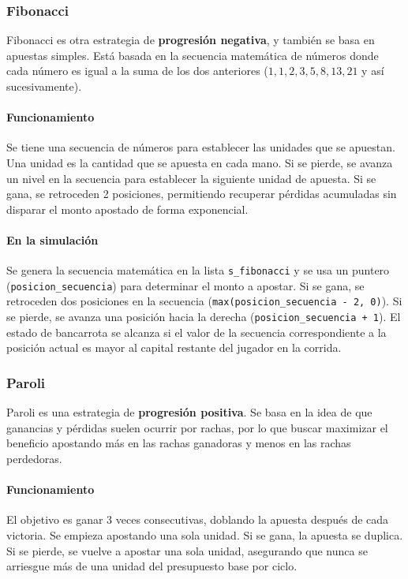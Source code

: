 \documentclass{article}
\begin{document}
\subsubsection{Fibonacci}
Fibonacci es otra estrategia de \textbf{progresión negativa}, y también se basa en apuestas simples. Está basada en la secuencia matemática de números donde cada número es igual a la suma de los dos anteriores ($1, 1, 2, 3, 5, 8, 13, 21$ y así sucesivamente).

\paragraph{Funcionamiento} Se tiene una secuencia de números para establecer las unidades que se apuestan. Una unidad es la cantidad que se apuesta en cada mano. Si se pierde, se avanza un nivel en la secuencia para establecer la siguiente unidad de apuesta. Si se gana, se retroceden 2 posiciones, permitiendo recuperar pérdidas acumuladas sin disparar el monto apostado de forma exponencial.\cite{fibonacci}

\paragraph{En la simulación} Se genera la secuencia matemática en la lista \texttt{s\_fibonacci} y se usa un puntero (\texttt{posicion\_secuencia}) para determinar el monto a apostar. Si se gana, se retroceden dos posiciones en la secuencia (\texttt{max(posicion\_secuencia - 2, 0)}). Si se pierde, se avanza una posición hacia la derecha (\texttt{posicion\_secuencia + 1}). El estado de bancarrota se alcanza si el valor de la secuencia correspondiente a la posición actual es mayor al capital restante del jugador en la corrida.

\subsubsection{Paroli}
Paroli es una estrategia de \textbf{progresión positiva}. Se basa en la idea de que ganancias y pérdidas suelen ocurrir por rachas, por lo que buscar maximizar el beneficio apostando más en las rachas ganadoras y menos en las rachas perdedoras.

\paragraph{Funcionamiento} El objetivo es ganar 3 veces consecutivas, doblando la apuesta después de cada victoria. Se empieza apostando una sola unidad. Si se gana, la apuesta se duplica. Si se pierde, se vuelve a apostar una sola unidad, asegurando que nunca se arriesgue más de una unidad del presupuesto base por ciclo.\cite{paroli}
\end{document}
